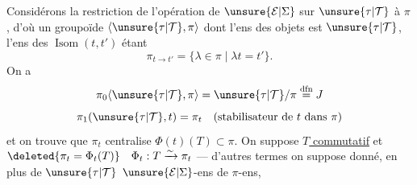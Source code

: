 
Considérons la restriction de l'opération de $\unsure{\mathcal E|\Sigma}$ sur $\unsure{\tau|\mathcal T}$ à $\pi$, d'où un groupoïde $\langle\unsure{\tau|\mathcal T},\pi\rangle$ dont l'ens des objets est $\unsure{\tau|\mathcal T}$, l'ens des $\operatorname{Isom}(t,t')$ étant
\[
\pi_{t\to t'}=\{\lambda\in\pi\mid\lambda t=t'\}.
\]
 On a
\[
\pi_0\langle\unsure{\tau|\mathcal T},\pi\rangle=\unsure{\tau|\mathcal T}/\pi\overset{\mathrm{dfn}}{=}J
\]
\[
\pi_1(\unsure{\tau|\mathcal T},t)=\pi_t\quad(\text{stabilisateur de }t\text{ dans }\pi)
\]
et on trouve que $\pi_t$ centralise $\Phi(t)(T)\subset\pi$. On suppose \uline{$T$ commutatif} et $\deleted{\pi_t=\Phi_t(T)}\quad\Phi_t:T\xrightarrow{\sim}\pi_t$ ---  d'autres termes on suppose donné, en plus de $\unsure{\tau|\mathcal T}$ $\unsure{\mathcal E|\Sigma}$-ens de $\pi$-ens,
